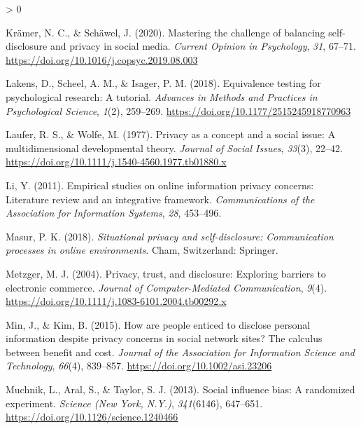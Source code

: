 \documentclass[
  english,
  man,floatsintext]{apa6}
\newlength{\cslhangindent}
\newenvironment{CSLReferences}[2] %
 {%
  \setlength{\parindent}{0pt}
  \ifodd #1 \everypar{\setlength{\hangindent}{\cslhangindent}}\ignorespaces\fi
  \ifnum #2 > 0
  \setlength{\parskip}{#2\baselineskip}
  \fi
 }%
 {}
\begin{document}
\begin{CSLReferences}{1}{0}
\leavevmode\hypertarget{ref-kramerMasteringChallengeBalancing2020}{}%
Krämer, N. C., \& Schäwel, J. (2020). Mastering the challenge of balancing self-disclosure and privacy in social media. \emph{Current Opinion in Psychology}, \emph{31}, 67--71. \url{https://doi.org/10.1016/j.copsyc.2019.08.003}

\leavevmode\hypertarget{ref-lakensEquivalenceTestingPsychological2018}{}%
Lakens, D., Scheel, A. M., \& Isager, P. M. (2018). Equivalence testing for psychological research: {A} tutorial. \emph{Advances in Methods and Practices in Psychological Science}, \emph{1}(2), 259--269. \url{https://doi.org/10.1177/2515245918770963}

\leavevmode\hypertarget{ref-lauferPrivacyConceptSocial1977}{}%
Laufer, R. S., \& Wolfe, M. (1977). Privacy as a concept and a social issue: {A} multidimensional developmental theory. \emph{Journal of Social Issues}, \emph{33}(3), 22--42. \url{https://doi.org/10.1111/j.1540-4560.1977.tb01880.x}

\leavevmode\hypertarget{ref-liEmpiricalStudiesOnline2011}{}%
Li, Y. (2011). Empirical studies on online information privacy concerns: {Literature} review and an integrative framework. \emph{Communications of the Association for Information Systems}, \emph{28}, 453--496.

\leavevmode\hypertarget{ref-masurSituationalPrivacySelfdisclosure2018}{}%
Masur, P. K. (2018). \emph{Situational privacy and self-disclosure: {Communication} processes in online environments}. Cham, Switzerland: Springer.

\leavevmode\hypertarget{ref-metzgerPrivacyTrustDisclosure2004}{}%
Metzger, M. J. (2004). Privacy, trust, and disclosure: {Exploring} barriers to electronic commerce. \emph{Journal of Computer-Mediated Communication}, \emph{9}(4). \url{https://doi.org/10.1111/j.1083-6101.2004.tb00292.x}

\leavevmode\hypertarget{ref-minHowArePeople2015}{}%
Min, J., \& Kim, B. (2015). How are people enticed to disclose personal information despite privacy concerns in social network sites? {The} calculus between benefit and cost. \emph{Journal of the Association for Information Science and Technology}, \emph{66}(4), 839--857. \url{https://doi.org/10.1002/asi.23206}

\leavevmode\hypertarget{ref-muchnikSocialInfluenceBias2013}{}%
Muchnik, L., Aral, S., \& Taylor, S. J. (2013). Social influence bias: {A} randomized experiment. \emph{Science (New York, N.Y.)}, \emph{341}(6146), 647--651. \url{https://doi.org/10.1126/science.1240466}


\end{CSLReferences}
\end{document}
